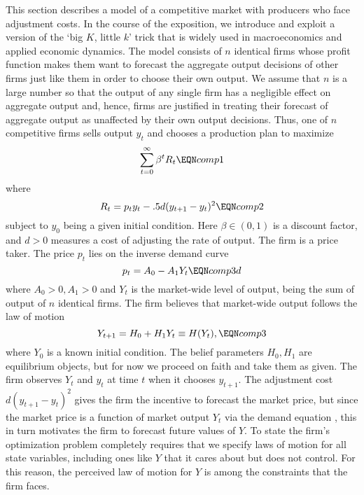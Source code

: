   This section describes a model of a competitive market with
producers who face adjustment costs. %
In the course of the exposition, we
 introduce and exploit  a version of the `big $K$, little $k$' trick that is widely used in macroeconomics and applied economic dynamics.
 The model consists of $n$ identical firms whose profit function
makes them want to forecast the aggregate output decisions
of other firms just like them in order to choose
their own output.    We assume that $n$ is a large number
so that the output of any single firm has a negligible effect on
aggregate output and, hence, firms are justified in treating their forecast
of aggregate output as unaffected by their own output decisions.
  Thus, one of $n$  competitive firms sells  output $y_t$
and chooses a production plan to maximize
$$ \sum_{t=0}^\infty \beta^t R_t  \EQN comp1 $$
where
$$ R_t = p_t y_t - .5 d (y_{t+1} - y_t )^2 \EQN comp2 $$
subject to $y_0$ being a given initial condition.  Here
$\beta \in (0,1)$ is a discount factor, and $d >0$ measures
a cost of adjusting the rate of output.  The firm is a
price taker.  The price $p_t$ lies on the inverse demand curve
$$ p_t = A_0 - A_1 Y_t \EQN comp3d $$
where $A_0 >0, A_1 > 0 $ and $Y_t$ is the market-wide level of
output, being the sum of output of $n$ identical firms.
The firm believes that market-wide output
follows the law of motion
$$ Y_{t+1} = H_0 + H_1 Y_t \equiv H(Y_t) , \EQN comp3 $$
where $Y_0$ is a known initial condition.  The
belief parameters $H_0, H_1$ are   equilibrium
objects, but for now we proceed on faith and
take them  as given.
The firm observes $Y_t$ and $y_t$ at time $t$ when it chooses
$y_{t+1}$.    The adjustment cost $d(y_{t+1}-y_t)^2$ gives
the firm the incentive to forecast the market price, but since the market price
is a function of market output $Y_t$ via the demand equation , this in turn motivates the firm to forecast future
values of $Y$.  To state the firm's optimization problem completely requires that
we specify laws of motion for all state variables, including ones like $Y$ that it cares
about but does not control.  For this reason, the perceived law of motion  for $Y$ is among the constraints
that the firm faces.

